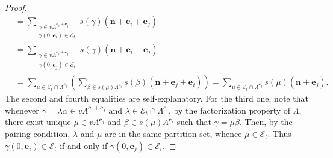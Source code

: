 \documentclass[12pt]{amsart}
\newcommand{\N}{\mathbf{n}}
\theoremstyle{definition}
\theoremstyle{remark}
\begin{document}
\begin{proof}
\begin{align*}
&= \displaystyle{\sum_{\substack{\gamma\in v\Lambda^{\mathbf{e}_i+\mathbf{e}_j}\\\gamma(0,\mathbf{e}_i)\in \mathcal{E}_t}}} s(\gamma)(\N+\mathbf{e}_i+\mathbf{e}_j)\\
&= \displaystyle{\sum_{\substack{\gamma\in v\Lambda^{\mathbf{e}_i+\mathbf{e}_j}\\\gamma(0,\mathbf{e}_j)\in \mathcal{E}_t}}} s(\gamma)(\N+\mathbf{e}_i+\mathbf{e}_j)\\
&= \displaystyle{\sum_{\mu\in \mathcal{E}_t\cap \Lambda^{\mathbf{e}_j}}} \left(\displaystyle{\sum_{\beta\in s(\mu)\Lambda^{\mathbf{e}_i}}} s(\beta)(\N+\mathbf{e}_j+\mathbf{e}_i)\right)=\displaystyle{\sum_{\mu\in \mathcal{E}_t\cap \Lambda^{\mathbf{e}_j}}} s(\mu)(\N+\mathbf{e}_j).
\end{align*}
The second and fourth equalities are self-explanatory. For the third one, note that whenever $\gamma=\lambda\alpha\in v\Lambda^{\mathbf{e}_i+\mathbf{e}_j}$ and $\lambda\in \mathcal{E}_t\cap \Lambda^{\mathbf{e}_i}$, by the factorization property of $\Lambda$, there exist unique $\mu\in v\Lambda^{\mathbf{e}_j}$ and $\beta\in s(\mu)\Lambda^{\mathbf{e}_i}$ such that $\gamma=\mu\beta$. Then, by the pairing condition, $\lambda$ and $\mu$ are in the same partition set, whence $\mu\in \mathcal{E}_t$. Thus $\gamma(0,\mathbf{e}_i)\in \mathcal{E}_t$ if and only if $\gamma(0,\mathbf{e}_j)\in \mathcal{E}_t$. 


\end{proof}
\end{document}
